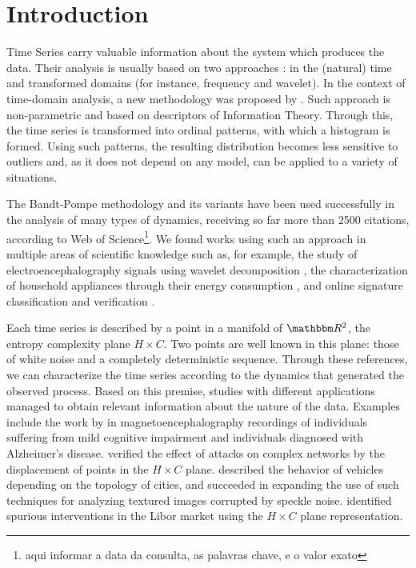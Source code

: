 \section{Introduction}\label{Sec:Intro}

Time Series carry valuable information about the system which produces the data.
Their analysis is usually based on two approaches \citep{TimeSeriesAnalysisCryerChan}: in the (natural) time and transformed domains (for instance, frequency and wavelet).
In the context of time-domain analysis, a new methodology was proposed by \cite{PermutationEntropyBandtPompe}.
Such approach is non-parametric and based on descriptors of Information Theory.
Through this, the time series is transformed into ordinal patterns, with which a histogram is formed.
Using such patterns, the resulting distribution becomes less sensitive to outliers and, as it does not depend on any model, can be applied to a variety of situations.

The Bandt-Pompe methodology and its variants have been used successfully in the analysis of many types of dynamics, receiving so far more than \num{2500} citations, according to Web of Science\footnote{aqui informar a data da consulta, as palavras chave, e o valor exato}.
We found works using such an approach in multiple areas of scientific knowledge such as, for example,
the study of electroencephalography signals using wavelet decomposition \citep{EEGAnalysisWaveletInformationTools},
the characterization of household appliances through their energy consumption \citep{CharacterizationElectricLoadInformationTheoryQuantifiers},
and online signature classification and verification \citep{ClassificationVerificationOnlineHandwrittenSignatures}.

Each time series is described by a point in a manifold of $\mathbbm R^2$, the entropy complexity plane $H\times C$.
Two points are well known in this plane: those of white noise and a completely deterministic sequence.
Through these references, we can characterize the time series according to the dynamics that generated the observed process.
Based on this premise, studies with different applications managed to obtain relevant information about the nature of the data.
Examples include the work by \cite{echegoyen2020permutation} in magnetoencephalography recordings of individuals suffering from mild cognitive impairment and individuals diagnosed with Alzheimer's disease.
\cite{InformationTheoryPerspectiveNetworkRobustness} verified the effect of attacks on complex networks by the displacement of points in the $H \times C$ plane.
\cite{CharacterizationVehicleBehaviorInformationTheory} described the behavior of vehicles depending on the topology of cities, and
\cite{Chagas2020Characterization} succeeded in expanding the use of such techniques for analyzing textured images corrupted by speckle noise.
\cite{LiborInvisibleHand} identified spurious interventions in the Libor market using the $H\times C$ plane representation.

